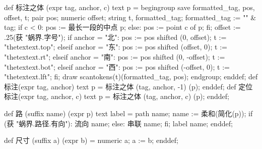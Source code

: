 def 标注之体 (expr tag, anchor, c) text p =
  begingroup
    save formatted_tag, pos, offset, t;
    pair pos; numeric offset; string t, formatted_tag;
    formatted_tag := "\tfx" & tag;
    if c < 0:
      pos := 最长一段的中点 p;
    else:
      pos := point c of p;
    fi;
    offset := .25(获 "蜗界.字号");
    if anchor = "北":
      pos := pos shifted (0, offset);
      t := "thetextext.top";
    elseif anchor = "东":
      pos := pos shifted (offset, 0);
      t := "thetextext.rt";
    elseif anchor = "南":
      pos := pos shifted (0, -offset);
      t := "thetextext.bot";
    elseif anchor = "西":
      pos := pos shifted (-offset, 0);
      t := "thetextext.lft";
    fi;
    draw scantokens(t)(formatted_tag, pos);
  endgroup;
enddef;
def 标注(expr tag, anchor) text p =
  标注之体 (tag, anchor, -1) (p);
enddef;
def 定位标注(expr tag, anchor, c) text p =
  标注之体 (tag, anchor, c) (p);
enddef;
\stopMPinclusions

\startMPinclusions[+]
def 路 (suffix name) (expr p) text label =
  path name; name := 柔和(简化(p));
  if (获 "蜗界.路径.有向"):
    流向 name;
  else:
    串联 name;
  fi;
  label name;
enddef;
\stopMPinclusions

\startMPinclusions[+]
def 尺寸 (suffix a) (expr b) =
  numeric a;
  a := b;
enddef;
\stopMPinclusions
